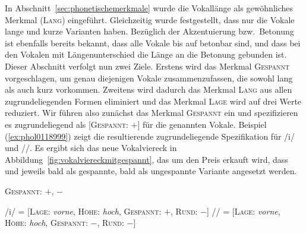 In Abschnitt~\ref{sec:phonetischemerkmale} wurde die Vokallänge als gewöhnliches Merkmal (\textsc{Lang}) eingeführt.
Gleichzeitig wurde festgestellt, dass nur die Vokale \textipa{[i y u e \o\ E o a]} lange und kurze Varianten haben.
Bezüglich der Akzentuierung bzw.\ Betonung ist ebenfalls bereits bekannt, dass alle Vokale bis auf \textipa{[@ 5]} betonbar sind, und dass bei den Vokalen mit Längenunterschied die Länge an die Betonung gebunden ist.
Dieser Abschnitt verfolgt nun zwei Ziele.
Erstens wird das Merkmal \textsc{Gespannt} vorgeschlagen, um genau diejenigen Vokale zusammenzufassen, die sowohl lang als auch kurz vorkommen.
Zweitens wird dadurch das Merkmal \textsc{Lang} aus allen zugrundeliegenden Formen eliminiert und das Merkmal \textsc{Lage} wird auf drei Werte reduziert.
Wir führen also zunächst das Merkmal \textsc{Gespannt} ein und spezifizieren es zugrundeliegend als [\textsc{Gespannt}: $+$] für die genannten Vokale.
Beispiel (\ref{ex:phol0118999}) zeigt die resultierende zugrundeliegende Spezifikation für /i/ und //.
Es ergibt sich das neue Vokalviereck in Abbildung~\ref{fig:vokalviereckmitgespannt}, das um den Preis erkauft wird, dass \textipa{[E]} und \textipa{[a]} jeweils bald als gespannte, bald als ungespannte Variante angesetzt werden.

\begin{exe}
  \ex \textsc{Gespannt}: $+$, $-$
  \ex\label{ex:phol0118999}
  \begin{xlist}
  	\ex /i/ = [\textsc{Lage}: \textit{vorne}, \textsc{Höhe}: \textit{hoch}, \textsc{Gespannt}: $+$, \textsc{Rund}: $-$]
  	\ex // = [\textsc{Lage}: \textit{vorne}, \textsc{Höhe}: \textit{hoch}, \textsc{Gespannt}: $-$, \textsc{Rund}: $-$]
  \end{xlist}
\end{exe}

